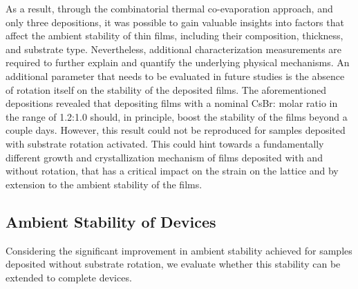 As a result, through the combinatorial thermal co-evaporation approach, and only three depositions, it was possible to gain valuable insights into factors that affect the ambient stability of  thin films, including their composition, thickness, and substrate type. Nevertheless, additional characterization measurements are required to further explain and quantify the underlying physical mechanisms. An additional parameter that needs to be evaluated in future studies is the absence of rotation itself on the stability of the deposited films. The aforementioned depositions revealed that depositing films with a nominal CsBr: molar ratio in the range of 1.2:1.0 should, in principle, boost the stability of the films beyond a couple days. However, this result could not be reproduced for samples deposited with substrate rotation activated. This could hint towards a fundamentally different growth and crystallization mechanism of films deposited with and without rotation, that has a critical impact on the strain on the lattice and by extension to the ambient stability of the films. 


\subsection{Ambient Stability of Devices}

Considering the significant improvement in ambient stability achieved for samples deposited without substrate rotation, we evaluate whether this stability can be extended to complete devices. 


